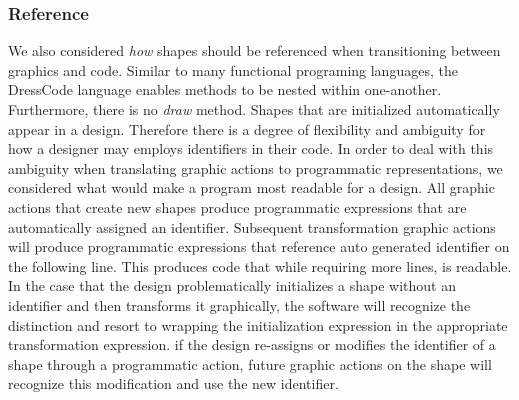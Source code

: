 \documentclass{sigchi}
\begin{document}
\subsubsection{Reference}
We also considered \textit{how} shapes should be referenced when transitioning between graphics and code. Similar to many functional programing languages, the DressCode language enables methods to be nested within one-another. Furthermore, there is no \textit{draw} method. Shapes that are initialized automatically appear in a design. Therefore there is a degree of flexibility and ambiguity for how a designer may employs identifiers in their code. In order to deal with this ambiguity when translating graphic actions to programmatic representations, we considered what would make a program most readable for a design. All graphic actions that create new shapes produce programmatic expressions that are automatically assigned an identifier. Subsequent transformation graphic actions will produce programmatic expressions that reference auto generated identifier on the following line. This produces code that while requiring more lines, is readable. In the case that the design problematically initializes a shape without an identifier and then transforms it graphically, the software will recognize the distinction and resort to wrapping the initialization expression in the appropriate transformation expression. if the design re-assigns or modifies the identifier of a shape through a programmatic action, future graphic actions on the shape will recognize this modification and use the new identifier.     
\end{document}
